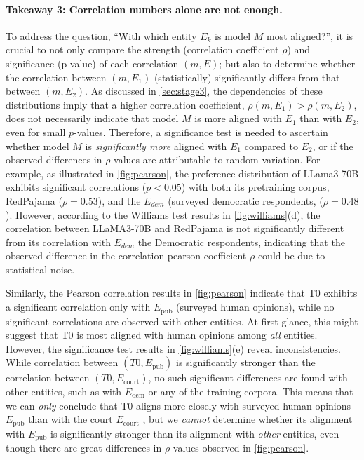 
\vspace{-0.3cm}
\paragraph{Takeaway 3: Correlation numbers alone are not enough.}
\label{sec:result_3}
To address the question, ``With which entity $E_k$ is model \( M \) most aligned?'', it is crucial to not only compare the strength (correlation coefficient \(\rho\)) and significance (p-value) of each correlation \((m, E)\); but also to determine whether the correlation between \((m, E_1)\) (statistically) significantly differs from that between \((m, E_2)\). As discussed in \autoref{sec:stage3}, the dependencies of these distributions imply that a higher correlation coefficient, \(\rho(m,E_1) > \rho(m,E_2)\), does not necessarily indicate that model \( M \) is more aligned with \( E_1 \) than with \( E_2 \), even for small $p$-values. Therefore, a significance test is needed to ascertain whether model \( M \) is \textit{significantly more} aligned with \( E_1 \) compared to \( E_2 \), or if the observed differences in \(\rho\) values are attributable to random variation. For example, as illustrated in \autoref{fig:pearson}, the preference distribution of LLama3-70B exhibits significant correlations (\(p < 0.05\)) with both its pretraining corpus, RedPajama (\(\rho = 0.53\)), and the \(E_{dem} \) (surveyed democratic respondents, (\(\rho = 0.48\)). However, according to the Williams test results in \autoref{fig:williams}(d), the correlation between LLaMA3-70B and RedPajama is not significantly different from its correlation with  \(E_{dem} \) the Democratic respondents, indicating that the observed difference in the correlation pearson coefficient $\rho$ could be due to statistical noise. 


Similarly, the Pearson correlation results in \autoref{fig:pearson} indicate that T0 exhibits a significant correlation only with \( E_{\text{pub}} \) (surveyed human opinions), while no significant correlations are observed with other entities. At first glance, this might suggest that T0 is most aligned with human opinions among \textit{all} entities.  
However, the significance test results in \autoref{fig:williams}(e) reveal inconsistencies. While correlation between \( (T0, E_{\text{pub}})  \) is significantly stronger than the correlation between \( (T0, E_{\text{court}}) \), no such significant differences are found with other entities, such as with $E_{\text{dem}}$ or any of the training corpora. This means that we can \textit{only} conclude that T0 aligns more closely with surveyed human opinions $E_{\text{pub}}$ than with the court $E_{\text{court}}$ , but we \textit{cannot} determine whether its alignment with \( E_{\text{pub}} \) is significantly stronger than its alignment with \textit{other} entities, even though there are great differences in \( \rho \)-values observed in \autoref{fig:pearson}.

